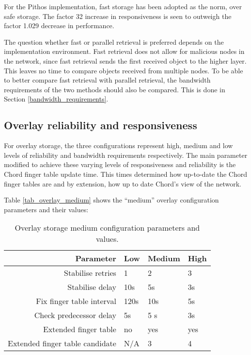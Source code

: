 For the Pithos implementation, fast storage has been adopted as the norm, over safe storage. The factor 32 increase in responsiveness is seen to outweigh the factor 1.029 decrease in performance.

The question whether fast or parallel retrieval is preferred depends on the implementation environment. Fast retrieval does not allow for malicious nodes in the network, since fast retrieval sends the first received object to the higher layer. This leaves no time to compare objects received from multiple nodes. To be able to better compare fast retrieval with parallel retrieval, the bandwidth requirements of the two methods should also be compared. This is done in Section \ref{bandwidth_requirements}.

\subsection{Overlay reliability and responsiveness}
\label{overlay_resp_rel_results}

For overlay storage, the three configurations represent high, medium and low levels of reliability and bandwidth requirements respectively. The main parameter modified to achieve these varying levels of responsiveness and reliability is the Chord finger table update time. This times determined how up-to-date the Chord finger tables are and by extension, how up to date Chord's view of the network.

Table \ref{tab_overlay_medium} shows the ``medium'' overlay configuration parameters and their values:
%
\begin{table}[htbp]
\centering
\begin{tabular}{|r|l|l|l|}
\hline
Parameter                       & Low  & Medium & High  \\
\hline
Stabilise retries               & 1    & 2      &  3    \\
Stabilise delay                 & 10s  & 5s     &  3s   \\
Fix finger table interval       & 120s & 10s    &  5s   \\
Check predecessor delay         & 5s   & 5 s    &  3s   \\
Extended finger table           & no   & yes    &  yes  \\
Extended finger table candidate & N/A  & 3      &  4    \\
\hline
\end{tabular}
\caption{Overlay storage medium configuration parameters and values.}
\label{tab_overlay_configs}
\end{table}

